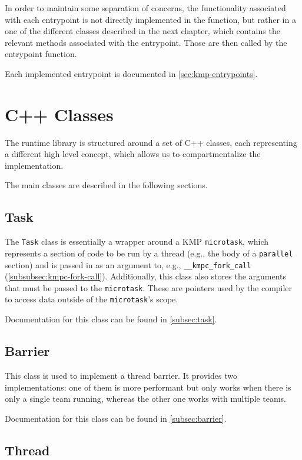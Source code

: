 In order to maintain some separation of concerns, the functionality associated with each entrypoint
is not directly implemented in the function, but rather in a one of the different classes described
in the next chapter, which contains the relevant methods associated with the entrypoint. Those are
then called by the entrypoint function.

Each implemented entrypoint is documented in \cref{sec:kmp-entrypoints}.

\section{C++ Classes}

The runtime library is structured around a set of C++ classes, each representing a different high
level concept, which allows us to compartmentalize the implementation.

The main classes are described in the following sections.

\subsection{Task}

The \texttt{Task} class is essentially a wrapper around a KMP \texttt{microtask}, which represents a
section of code to be run by a thread (e.g., the body of a \texttt{parallel} section) and is passed
in as an argument to, e.g., \texttt{__kmpc_fork_call} (\cref{subsubsec:kmpc-fork-call}).
Additionally, this class also stores the arguments that must be passed to the \texttt{microtask}.
These are pointers used by the compiler to access data outside of the \texttt{microtask}'s scope.

Documentation for this class can be found in \cref{subsec:task}.

\subsection{Barrier}

This class is used to implement a thread barrier. It provides two implementations: one of them is
more performant but only works when there is only a single team running, whereas the other one works
with multiple teams.

Documentation for this class can be found in \cref{subsec:barrier}.

\subsection{Thread}

